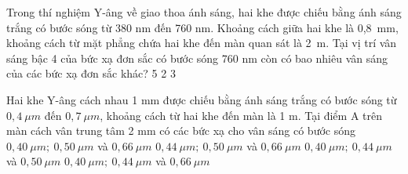 \begin{ex}%
Trong thí nghiệm Y-âng về giao thoa ánh sáng, hai khe được chiếu bằng ánh sáng trắng có bước sóng từ 380 nm đến 760 nm. Khoảng cách giữa hai khe là 0,8\ mm, khoảng cách từ mặt phẳng chứa hai khe đến màn quan sát là 2\ m. Tại vị trí vân sáng bậc 4 của bức xạ đơn sắc có bước sóng 760 nm còn có bao nhiêu vân sáng của các bức xạ đơn sắc khác?
\choice
{5}
{2}
{3}
{}
\end{ex} 
\begin{ex}%
Hai khe Y-âng cách nhau 1 mm được chiếu bằng ánh sáng trắng có bước sóng từ $0,4\ \mu m $ đến $0,7\ \mu m $, khoảng cách từ hai khe đến màn là 1 m. Tại điểm A trên màn cách vân trung tâm 2 mm có các bức xạ cho vân sáng có bước sóng
\choice
{\True $0,40\ \mu m;\ 0,50\ \mu m $ và $0,66\ \mu m $}
{ $0,44\ \mu m;\ 0,50\ \mu m $ và $0,66\ \mu m $}
{ $0,40\ \mu m;\ 0,44\ \mu m $ và $0,50\ \mu m $}
{ $0,40\ \mu m;\ 0,44\ \mu m $ và $0,66\ \mu m $}
\end{ex} 

